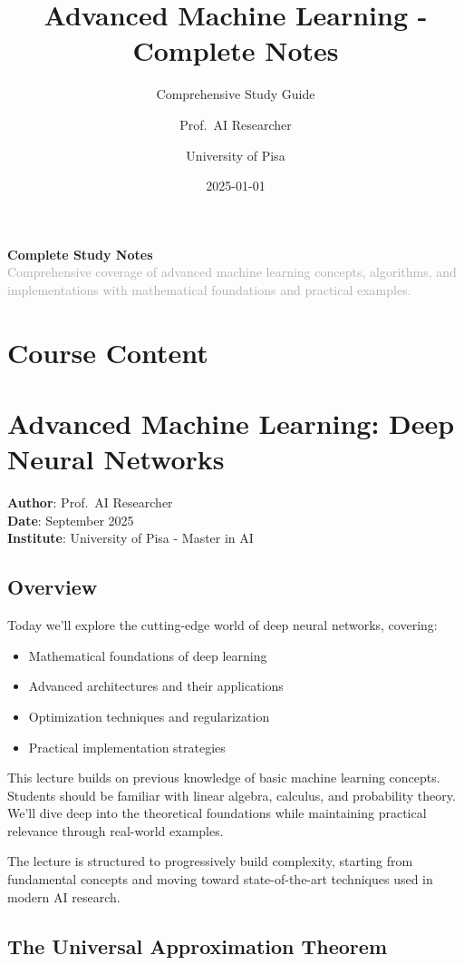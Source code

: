 \documentclass[
  11pt,
  letterpaper,
]{article}
\title{Advanced Machine Learning - Complete Notes}
\subtitle{Comprehensive Study Guide}
\author{Prof.~AI Researcher \and University of Pisa}
\date{2025-01-01}
\makeatletter
\providecommand{\tightlist}{%
  \setlength{\itemsep}{0pt}\setlength{\parskip}{0pt}}
\renewcommand{\maketitle}{%
  \begin{titlepage}
    \centering
    \vspace*{2cm}

    {\Huge\bfseries\color{primaryblue}\@title\par}
    \vspace{0.5cm}
    {\Large\color{mediumgray}\@subtitle\par}
    \vspace{2cm}

    {\LARGE\color{darkgray}\@author\par}
    \vspace{1cm}
    {\large\color{mediumgray}\@date\par}

    \vfill

    \begin{tcolorbox}[
      colback=lightblue,
      colframe=primaryblue,
      width=0.8\textwidth,
      arc=6pt,
      boxrule=0pt,
      left=20pt,
      right=20pt,
      top=15pt,
      bottom=15pt
    ]
      \centering
      \textbf{\color{primaryblue}Complete Study Notes}\\
      \vspace{0.3cm}
      \textcolor{darkgray}{Comprehensive coverage of advanced machine learning concepts, algorithms, and implementations with mathematical foundations and practical examples.}
    \end{tcolorbox}

    \vspace{1cm}
  \end{titlepage}
}
\renewcommand*\contentsname{Table of contents}
\newcommand\contentsname{Table of contents}
\makeatother
\begin{document}
\maketitle

\renewcommand*\contentsname{Table of contents}
{
\hypersetup{linkcolor=black}
\setcounter{tocdepth}{3}
\tableofcontents
}

\section{Course Content}\label{course-content}

\section{Advanced Machine Learning: Deep Neural
Networks}\label{advanced-machine-learning-deep-neural-networks}

\textbf{Author}: Prof.~AI Researcher\\
\textbf{Date}: September 2025\\
\textbf{Institute}: University of Pisa - Master in AI

\subsection{Overview}\label{overview}

Today we'll explore the cutting-edge world of deep neural networks,
covering:

\begin{itemize}
\tightlist
\item
  Mathematical foundations of deep learning
\item
  Advanced architectures and their applications
\item
  Optimization techniques and regularization
\item
  Practical implementation strategies
\end{itemize}

This lecture builds on previous knowledge of basic machine learning
concepts. Students should be familiar with linear algebra, calculus, and
probability theory. We'll dive deep into the theoretical foundations
while maintaining practical relevance through real-world examples.

The lecture is structured to progressively build complexity, starting
from fundamental concepts and moving toward state-of-the-art techniques
used in modern AI research.

\subsection{The Universal Approximation
Theorem}\label{the-universal-approximation-theorem}
\end{document}
